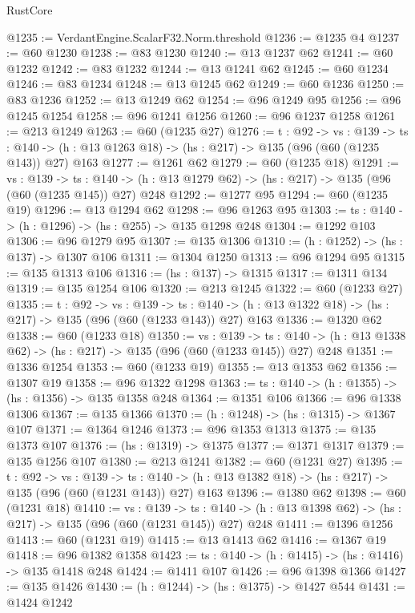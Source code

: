 \begin{lexlean}{RustCore}
\begin{coremodule}
@1235 := VerdantEngine.ScalarF32.Norm.threshold
@1236 := @1235 @4
@1237 := @60 @1230
@1238 := @83 @1230
@1240 := @13 @1237 @62
@1241 := @60 @1232
@1242 := @83 @1232
@1244 := @13 @1241 @62
@1245 := @60 @1234
@1246 := @83 @1234
@1248 := @13 @1245 @62
@1249 := @60 @1236
@1250 := @83 @1236
@1252 := @13 @1249 @62
@1254 := @96 @1249 @95
@1256 := @96 @1245 @1254
@1258 := @96 @1241 @1256
@1260 := @96 @1237 @1258
@1261 := @213 @1249
@1263 := @60 (@1235 @27)
@1276 := {t : @92} ->
  {vs : @139} ->
  {ts : @140} -> (h : @13 @1263 @18) -> (hs : @217) -> @135 (@96 (@60 (@1235 @143)) @27) @163
@1277 := @1261 @62
@1279 := @60 (@1235 @18)
@1291 := {vs : @139} ->
  {ts : @140} -> (h : @13 @1279 @62) -> (hs : @217) -> @135 (@96 (@60 (@1235 @145)) @27) @248
@1292 := @1277 @95
@1294 := @60 (@1235 @19)
@1296 := @13 @1294 @62
@1298 := @96 @1263 @95
@1303 := {ts : @140} -> (h : @1296) -> (hs : @255) -> @135 @1298 @248
@1304 := @1292 @103
@1306 := @96 @1279 @95
@1307 := @135 @1306
@1310 := (h : @1252) -> (hs : @137) -> @1307 @106
@1311 := @1304 @1250
@1313 := @96 @1294 @95
@1315 := @135 @1313 @106
@1316 := (hs : @137) -> @1315
@1317 := @1311 @134
@1319 := @135 @1254 @106
@1320 := @213 @1245
@1322 := @60 (@1233 @27)
@1335 := {t : @92} ->
  {vs : @139} ->
  {ts : @140} -> (h : @13 @1322 @18) -> (hs : @217) -> @135 (@96 (@60 (@1233 @143)) @27) @163
@1336 := @1320 @62
@1338 := @60 (@1233 @18)
@1350 := {vs : @139} ->
  {ts : @140} -> (h : @13 @1338 @62) -> (hs : @217) -> @135 (@96 (@60 (@1233 @145)) @27) @248
@1351 := @1336 @1254
@1353 := @60 (@1233 @19)
@1355 := @13 @1353 @62
@1356 := @1307 @19
@1358 := @96 @1322 @1298
@1363 := {ts : @140} -> (h : @1355) -> (hs : @1356) -> @135 @1358 @248
@1364 := @1351 @106
@1366 := @96 @1338 @1306
@1367 := @135 @1366
@1370 := (h : @1248) -> (hs : @1315) -> @1367 @107
@1371 := @1364 @1246
@1373 := @96 @1353 @1313
@1375 := @135 @1373 @107
@1376 := (hs : @1319) -> @1375
@1377 := @1371 @1317
@1379 := @135 @1256 @107
@1380 := @213 @1241
@1382 := @60 (@1231 @27)
@1395 := {t : @92} ->
  {vs : @139} ->
  {ts : @140} -> (h : @13 @1382 @18) -> (hs : @217) -> @135 (@96 (@60 (@1231 @143)) @27) @163
@1396 := @1380 @62
@1398 := @60 (@1231 @18)
@1410 := {vs : @139} ->
  {ts : @140} -> (h : @13 @1398 @62) -> (hs : @217) -> @135 (@96 (@60 (@1231 @145)) @27) @248
@1411 := @1396 @1256
@1413 := @60 (@1231 @19)
@1415 := @13 @1413 @62
@1416 := @1367 @19
@1418 := @96 @1382 @1358
@1423 := {ts : @140} -> (h : @1415) -> (hs : @1416) -> @135 @1418 @248
@1424 := @1411 @107
@1426 := @96 @1398 @1366
@1427 := @135 @1426
@1430 := (h : @1244) -> (hs : @1375) -> @1427 @544
@1431 := @1424 @1242

\end{coremodule}
\end{lexlean}
